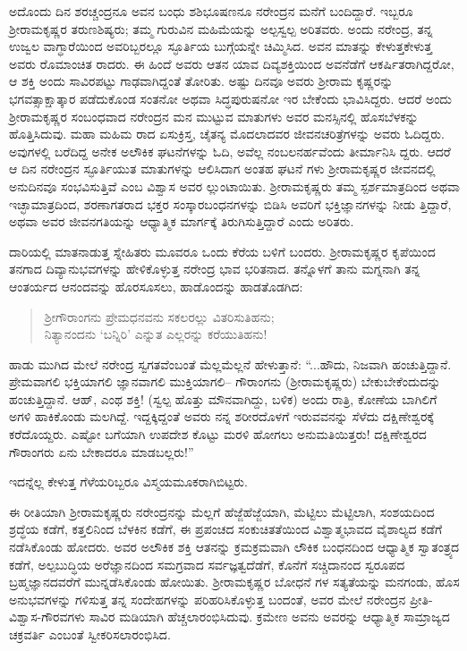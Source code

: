 ಅದೊಂದು ದಿನ ಶರಚ್ಚಂದ್ರನೂ ಅವನ ಬಂಧು ಶಶಿಭೂಷಣನೂ ನರೇಂದ್ರನ ಮನೆಗೆ ಬಂದಿದ್ದಾರೆ. ಇಬ್ಬರೂ ಶ್ರೀರಾಮಕೃಷ್ಣರ ತರುಣಶಿಷ್ಯರು; ತಮ್ಮ ಗುರುವಿನ ಮಹಿಮೆಯನ್ನು ಅಲ್ಪಸ್ವಲ್ಪ ಅರಿತವರು. ಅಂದು ನರೇಂದ್ರ, ತನ್ನ ಉಜ್ವಲ ವಾಗ್ಧಾರೆಯಿಂದ ಅವರಿಬ್ಬರಲ್ಲೂ ಸ್ಫೂರ್ತಿಯ ಬುಗ್ಗೆಯನ್ನೇ ಚಿಮ್ಮಿಸಿದ. ಅವನ ಮಾತನ್ನು ಕೇಳುತ್ತಕೇಳುತ್ತ ಅವರು ರೊಮಾಂಚಿತ ರಾದರು. ಈ ಹಿಂದೆ ಅವರು ಆತನ ಯಾವ ದಿವ್ಯಶಕ್ತಿಯಿಂದ ಅವನೆಡೆಗೆ ಆಕರ್ಷಿತರಾಗಿದ್ದರೋ, ಆ ಶಕ್ತಿ ಅಂದು ಸಾವಿರಪಟ್ಟು ಗಾಢವಾಗಿದ್ದಂತೆ ತೋರಿತು. ಅಷ್ಟು ದಿನವೂ ಅವರು ಶ್ರೀರಾಮ ಕೃಷ್ಣರನ್ನು ಭಗವತ್ಸಾಕ್ಷಾತ್ಕಾರ ಪಡೆದುಕೊಂಡ ಸಂತನೋ ಅಥವಾ ಸಿದ್ಧಪುರುಷನೋ ಇರ ಬೇಕೆಂದು ಭಾವಿಸಿದ್ದರು. ಆದರೆ ಅಂದು ಶ್ರೀರಾಮಕೃಷ್ಣರ ಸಂಬಂಧವಾದ ನರೇಂದ್ರನ ಮನ ಮುಟ್ಟುವ ಮಾತುಗಳು ಅವರ ಮನಸ್ಸಿನಲ್ಲಿ ಹೊಸಬೆಳಕನ್ನು ಹೊತ್ತಿಸಿದುವು. ಮಹಾ ಮಹಿಮ ರಾದ ಏಸುಕ್ರಿಸ್ತ, ಚೈತನ್ಯ ಮೊದಲಾದವರ ಜೀವನಚರಿತ್ರೆಗಳನ್ನು ಅವರು ಓದಿದ್ದರು. ಅವುಗಳಲ್ಲಿ ಬರೆದಿದ್ದ ಅನೇಕ ಅಲೌಕಿಕ ಘಟನೆಗಳನ್ನು ಓದಿ, ಅವೆಲ್ಲ ನಂಬಲನರ್ಹವೆಂದು ತೀರ್ಮಾನಿಸಿ ದ್ದರು. ಆದರೆ ಆ ದಿನ ನರೇಂದ್ರನ ಸ್ಫೂರ್ತಿಯುತ ಮಾತುಗಳನ್ನು ಆಲಿಸಿದಾಗ ಅಂತಹ ಘಟನೆ ಗಳು ಶ್ರೀರಾಮಕೃಷ್ಣರ ಜೀವನದಲ್ಲಿ ಅನುದಿನವೂ ಸಂಭವಿಸುತ್ತಿವೆ ಎಂಬ ವಿಶ್ವಾಸ ಅವರ ಲ್ಲುಂಟಾಯಿತು. ಶ್ರೀರಾಮಕೃಷ್ಣರು ತಮ್ಮ ಸ್ಪರ್ಶಮಾತ್ರದಿಂದ ಅಥವಾ ಇಚ್ಛಾಮಾತ್ರದಿಂದ, ಶರಣಾಗತರಾದ ಭಕ್ತರ ಸಂಸ್ಕಾರಬಂಧನಗಳನ್ನು ಬಿಡಿಸಿ ಅವರಿಗೆ ಭಕ್ತಿಜ್ಞಾನಗಳನ್ನು ನೀಡು ತ್ತಿದ್ದಾರೆ, ಅಥವಾ ಅವರ ಜೀವನಗತಿಯನ್ನು ಆಧ್ಯಾತ್ಮಿಕ ಮಾರ್ಗಕ್ಕೆ ತಿರುಗಿಸುತ್ತಿದ್ದಾರೆ ಎಂದು ಅರಿತರು. 

ದಾರಿಯಲ್ಲಿ ಮಾತನಾಡುತ್ತ ಸ್ನೇಹಿತರು ಮೂವರೂ ಒಂದು ಕೆರೆಯ ಬಳಿಗೆ ಬಂದರು. ಶ್ರೀರಾಮಕೃಷ್ಣರ ಕೃಪೆಯಿಂದ ತನಗಾದ ದಿವ್ಯಾನುಭವಗಳನ್ನು ಹೇಳಿಕೊಳ್ಳುತ್ತ ನರೇಂದ್ರ ಭಾವ ಭರಿತನಾದ. ತನ್ನೊಳಗೆ ತಾನು ಮಗ್ನನಾಗಿ ತನ್ನ ಆಂತರ್ಯದ ಆನಂದವನ್ನು ಹೊರಸೂಸಲು, ಹಾಡೊಂದನ್ನು ಹಾಡತೊಡಗಿದ:

\begin{verse}
ಶ್ರೀಗೌರಾಂಗನು ಪ್ರೇಮಧನವನು ಸಕಲರಲ್ಲು ವಿತರಿಸುತಿಹನು;\\ನಿತ್ಯಾನಂದನು ‘ಬನ್ನಿರಿ’ ಎನ್ನುತ ಎಲ್ಲರನ್ನು ಕರೆಯುತಿಹನು!
\end{verse}

ಹಾಡು ಮುಗಿದ ಮೇಲೆ ನರೇಂದ್ರ ಸ್ವಗತವೆಂಬಂತೆ ಮೆಲ್ಲಮೆಲ್ಲನೆ ಹೇಳುತ್ತಾನೆ: “...ಹೌದು, ನಿಜವಾಗಿ ಹಂಚುತ್ತಿದ್ದಾನೆ. ಪ್ರೇಮವಾಗಲಿ ಭಕ್ತಿಯಾಗಲಿ ಜ್ಞಾನವಾಗಲಿ ಮುಕ್ತಿಯಾಗಲಿ– ಗೌರಾಂಗನು (ಶ್ರೀರಾಮಕೃಷ್ಣರು) ಬೇಕುಬೇಕೆಂದುದನ್ನು ಹಂಚುತ್ತಿದ್ದಾನೆ. ಆಹ್, ಎಂಥ ಶಕ್ತಿ! (ಸ್ವಲ್ಪ ಹೊತ್ತು ಮೌನವಾಗಿದ್ದು, ಬಳಿಕ) ಅಂದು ರಾತ್ರಿ, ಕೋಣೆಯ ಬಾಗಿಲಿಗೆ ಅಗಳಿ ಹಾಕಿಕೊಂಡು ಮಲಗಿದ್ದೆ. ಇದ್ದಕ್ಕಿದ್ದಂತೆ ಅವರು ನನ್ನ ಶರೀರದೊಳಗೆ ಇರುವವನನ್ನು ಸೆಳೆದು ದಕ್ಷಿಣೇಶ್ವರಕ್ಕೆ ಕರೆದೊಯ್ದರು. ಎಷ್ಟೋ ಬಗೆಯಾಗಿ ಉಪದೇಶ ಕೊಟ್ಟು ಮರಳಿ ಹೋಗಲು ಅನುಮತಿಯಿತ್ತರು! ದಕ್ಷಿಣೇಶ್ವರದ ಗೌರಾಂಗರು ಏನು ಬೇಕಾದರೂ ಮಾಡಬಲ್ಲರು!”

ಇದನ್ನೆಲ್ಲ ಕೇಳುತ್ತ ಗೆಳೆಯರಿಬ್ಬರೂ ವಿಸ್ಮಯಮೂಕರಾಗಿಬಿಟ್ಟರು.

ಈ ರೀತಿಯಾಗಿ ಶ್ರೀರಾಮಕೃಷ್ಣರು ನರೇಂದ್ರನನ್ನು ಮೆಲ್ಲಗೆ ಹೆಜ್ಜೆಹೆಜ್ಜೆಯಾಗಿ, ಮೆಟ್ಟಿಲು ಮೆಟ್ಟಿಲಾಗಿ, ಸಂಶಯದಿಂದ ಶ್ರದ್ಧೆಯ ಕಡೆಗೆ, ಕತ್ತಲಿನಿಂದ ಬೆಳಕಿನ ಕಡೆಗೆ, ಈ ಪ್ರಪಂಚದ ಸಂಕುಚಿತತೆಯಿಂದ ವಿಶ್ವಾತ್ಮಭಾವದ ವೈಶಾಲ್ಯದ ಕಡೆಗೆ ನಡೆಸಿಕೊಂಡು ಹೋದರು. ಅವರ ಅಲೌಕಿಕ ಶಕ್ತಿ ಆತನನ್ನು ಕ್ರಮಕ್ರಮವಾಗಿ ಲೌಕಿಕ ಬಂಧನದಿಂದ ಆಧ್ಯಾತ್ಮಿಕ ಸ್ವಾತಂತ್ರ್ಯದ ಕಡೆಗೆ, ಅಲ್ಪಬುದ್ಧಿಯ ಅರೆಜ್ಞಾನದಿಂದ ಸಮಗ್ರವಾದ ಸರ್ವಜ್ಞತ್ವದೆಡೆಗೆ, ಕೊನೆಗೆ ಸಚ್ಚಿದಾನಂದ ಸ್ವರೂಪದ ಬ್ರಹ್ಮಜ್ಞಾನದವರೆಗೆ ಮುನ್ನಡೆಸಿಕೊಂಡು ಹೋಯಿತು. ಶ್ರೀರಾಮಕೃಷ್ಣರ ಬೋಧನೆ ಗಳ ಸತ್ಯತೆಯನ್ನು ಮನಗಂಡು, ಹೊಸ ಅನುಭವಗಳನ್ನು ಗಳಿಸುತ್ತ ತನ್ನ ಸಂದೇಹಗಳನ್ನು ಪರಿಹರಿಸಿಕೊಳ್ಳುತ್ತ ಬಂದಂತೆ, ಅವರ ಮೇಲೆ ನರೇಂದ್ರನ ಪ್ರೀತಿ-ವಿಶ್ವಾಸ-ಗೌರವಗಳು ಸಾವಿರ ಮಡಿಯಾಗಿ ಹೆಚ್ಚಲಾರಂಭಿಸಿದುವು. ಕ್ರಮೇಣ ಅವನು ಅವರನ್ನು ಆಧ್ಯಾತ್ಮಿಕ ಸಾಮ್ರಾಜ್ಯದ ಚಕ್ರವರ್ತಿ ಎಂಬಂತೆ ಸ್ವೀಕರಿಸಲಾರಂಭಿಸಿದ.

